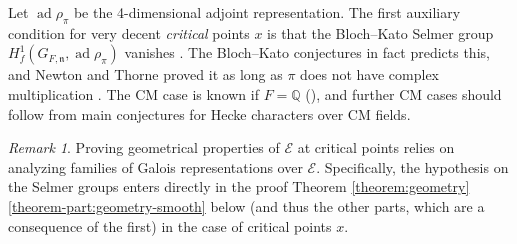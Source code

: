 \documentclass[10pt, twoside]{amsart}
\theoremstyle{plain}
\theoremstyle{definition}
\theoremstyle{remark}
\newtheorem{remark}[theorem]{Remark}
\numberwithin{equation}{subsection}
\def\Q{\mathbb Q}
\def\ad{\operatorname{ad}}
\def\gn{\mathfrak n}
\def\scre{\mathscr E}
\begin{document}
Let $\ad \rho_{\pi}$ be the 4-dimensional adjoint representation. The first auxiliary condition for very decent {\em critical} points $x$ is that the Bloch--Kato Selmer group $H^1_f(G_{F,\gn},\ad \rho_\pi)$ vanishes \cite{BK}. The Bloch--Kato conjectures in fact predicts this, and Newton and Thorne proved it as long as $\pi$ does not have complex multiplication \cite[Theorem B(1)]{NewtonThorne-AdjointSelmer}. The CM case is known if $F = \Q$ (\cite[Proposition 2.15(iv)]{Bel-Critical}), and further CM cases should follow from main conjectures for Hecke characters over CM fields.

\begin{remark}
Proving geometrical properties of $\scre$ at critical points relies on analyzing families of Galois representations over $\scre$. Specifically, the hypothesis on the Selmer groups enters directly in the proof Theorem \ref{theorem:geometry}\ref{theorem-part:geometry-smooth} below (and thus the other parts, which are a consequence of the first) in the case of critical points $x$.
\end{remark}
\end{document}
